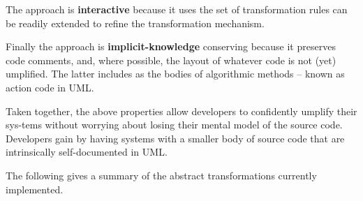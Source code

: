 The approach is \textbf{interactive} because it uses the set of transformation rules can be readily extended to refine the transformation mechanism. 

Finally the approach is \textbf{implicit-knowledge} conserving because it preserves code comments, and, where possible, the layout of whatever code is not (yet) umplified. The latter includes as the bodies of algorithmic methods – known as action code in UML.

Taken together, the above properties allow developers to confidently umplify their sys-tems without worrying about losing their mental model of the source code. Developers gain by having systems with a smaller body of source code that are intrinsically self-documented in UML. 

The following gives a summary of the abstract transformations currently implemented.

